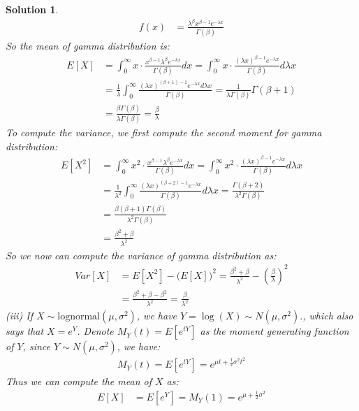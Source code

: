 \documentclass[11pt]{article}
\newtheorem{sol}{Solution}
\begin{document}
\begin{sol}
\begin{align*}
		f(x) &= \frac{\lambda^{\beta}x^{\beta - 1}e^{-\lambda x}}{\Gamma(\beta)}
	\end{align*}
	So the mean of gamma distribution is:
	\begin{align*}
		E[X] &= \int_0^{\infty}x\cdot \frac{x^{\beta - 1}\lambda^{\beta}e^{-\lambda x}}{\Gamma(\beta)}d x = \int_0^{\infty}x\cdot \frac{(\lambda x)^{\beta - 1}e^{-\lambda x}}{\Gamma(\beta)}d \lambda x\\
		&= \frac{1}{\lambda}\int_0^{\infty}\frac{(\lambda x)^{(\beta + 1) - 1}e^{-\lambda x}d\lambda x}{\Gamma(\beta)} = \frac{1}{\lambda\Gamma(\beta)}\Gamma(\beta + 1)\\
		&= \frac{\beta\Gamma(\beta)}{\lambda\Gamma(\beta)} = \frac{\beta}{\lambda}
	\end{align*}
	To compute the variance, we first compute the second moment for gamma distribution:
	\begin{align*}
		E[X^2] &= \int_0^{\infty}x^2\cdot \frac{x^{\beta - 1}\lambda^{\beta}e^{-\lambda x}}{\Gamma(\beta)}dx = \int_0^{\infty}x^2\cdot \frac{(\lambda x)^{\beta - 1}e^{-\lambda x}}{\Gamma(\beta)}d\lambda x\\
		&= \frac{1}{\lambda^2}\int_0^{\infty}\frac{(\lambda x)^{(\beta + 2) - 1}e^{-\lambda x}}{\Gamma(\beta)}d\lambda x = \frac{\Gamma(\beta + 2)}{\lambda^2\Gamma(\beta)}\\
		&= \frac{\beta(\beta + 1)\Gamma(\beta)}{\lambda^2\Gamma(\beta)}\\
		&= \frac{\beta^2 + \beta}{\lambda^2}
	\end{align*}
	So we now can compute the variance of gamma distribution as:
	\begin{align*}
		Var[X] &= E[X^2] - \Big(E[X]\Big)^2 = \frac{\beta^2 + \beta}{\lambda^2} - (\frac{\beta}{\lambda})^2\\
		&= \frac{\beta^2 + \beta - \beta^2}{\lambda^2} = \frac{\beta}{\lambda^2}
	\end{align*}
	(iii) If $X \sim \text{lognormal}(\mu, \sigma^2)$, we have $ Y = \log(X) \sim N(\mu, \sigma^2).$, which also says that $X = e^{Y}$. Denote $M_Y(t) = E[e^{tY}]$ as the moment generating function of $Y$, since $Y \sim N(\mu, \sigma^2)$, we have:
	\begin{align*}
		M_Y(t) = E[e^{tY}] = e^{\mu t + \frac{1}{2}\sigma^2t^2}
	\end{align*}
	Thus we can compute the mean of $X$ as:
	\begin{align*}
		E[X] &= E[e^{Y}] = M_Y(1) = e^{\mu + \frac{1}{2}\sigma^2}
	\end{align*}

\end{sol}
\end{document}
